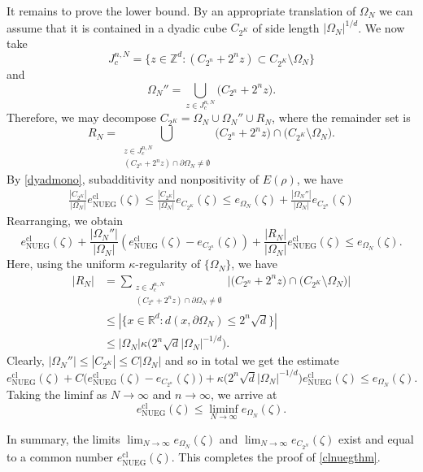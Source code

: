 \documentclass[final,onefignum,onetabnum,reqno]{amsart}
\theoremstyle{remark}
\renewcommand{\le}{\leqslant}
\newcommand{\RR}{\mathbb{R}}
\newcommand{\ZZ}{\mathbb{Z}}
\newcommand{\cl}{\mathrm{cl}} %
\newcommand{\NUEG}{\mathrm{NUEG}} %
\begin{document}
It remains to prove the lower bound. By an appropriate translation of $\Omega_N$ we can assume that it is contained in a dyadic cube $C_{2^K}$ of side length $|\Omega_N|^{1/d}$. 
We now take 
$$
J_c^{n,N}=\{z\in\ZZ^d : (C_{2^{n}} + 2^n z) \subset C_{2^K}\setminus\Omega_N\}
$$ 
and 
$$
\Omega_N''=\bigcup_{z\in J_c^{n,N}} \bigl(C_{2^{n}} + 2^n z\bigr).
$$
Therefore, we may decompose $C_{2^K}=\Omega_N\cup \Omega_N'' \cup R_N$, where the remainder set is
$$
R_N=\bigcup_{\substack{z\in J_c^{n,N}\\ (C_{2^{n}} + 2^n z)\cap\partial\Omega_N\neq\emptyset}} \bigl(C_{2^{n}} + 2^n z\bigr)\cap \bigl(C_{2^K}\setminus\Omega_N\bigr).
$$
By \cref{dyadmono}, subadditivity and nonpositivity of $E(\rho)$, we have 
\begin{align*}
\frac{|C_{2^K}|}{|\Omega_N|} e_\NUEG^\cl(\zeta) \le \frac{|C_{2^K}|}{|\Omega_N|}  e_{C_{2^K}}(\zeta)\le  e_{\Omega_N}(\zeta) 
+  \frac{|\Omega_N''|}{|\Omega_N|} e_{C_{2^n}}(\zeta)
\end{align*}
Rearranging, we obtain
$$
e_\NUEG^\cl(\zeta) + \frac{|\Omega_N''|}{|\Omega_N|}(e_\NUEG^\cl(\zeta)-e_{C_{2^n}}(\zeta)) + \frac{|R_N|}{|\Omega_N|} e_\NUEG^\cl(\zeta) 
\le e_{\Omega_N}(\zeta).
$$
Here, using the uniform $\kappa$-regularity of $\{\Omega_N\}$, we have 
\begin{align*}
|R_N|&=\sum_{\substack{z\in J_c^{n,N}\\ (C_{2^{n}} + 2^n z)\cap\partial\Omega_N\neq\emptyset}} \bigl|\bigl(C_{2^{n}} + 2^n z\bigr)\cap \bigl(C_{2^K}\setminus\Omega_N\bigr)\bigr|\\
&\le |\{x\in\RR^d : d(x,\partial\Omega_N)\le 2^{n}\sqrt{d}\}|\\
&\le |\Omega_N| \kappa\bigl(2^n\sqrt{d}|\Omega_N|^{-1/d}\bigr).
\end{align*}
Clearly, $|\Omega_N''|\le |C_{2^K}|\le C|\Omega_N|$ and so in total we get the estimate
$$
e_\NUEG^\cl(\zeta) + C\bigl(e_\NUEG^\cl(\zeta)-e_{C_{2^n}}(\zeta)\bigr) + \kappa\bigl(2^n\sqrt{d}|\Omega_N|^{-1/d}\bigr) e_\NUEG^\cl(\zeta)\le e_{\Omega_N}(\zeta).
$$
Taking the liminf as $N\to\infty$ and $n\to\infty$, we arrive at 
$$
e_\NUEG^\cl(\zeta)\le \liminf_{N\to\infty} e_{\Omega_N}(\zeta).
$$

In summary, the limits $\lim_{N\to\infty} e_{\Omega_N}(\zeta)$ and $\lim_{N\to\infty} e_{C_{2^N}}(\zeta)$ exist and equal to a common number
$e_\NUEG^\cl(\zeta)$. This completes the proof of \cref{clnuegthm}.

\end{document}
